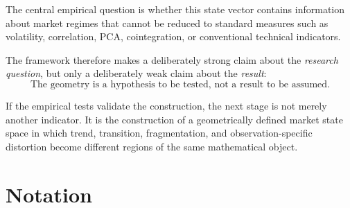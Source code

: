 \documentclass[11pt,a4paper]{article}
\numberwithin{equation}{section}
\begin{document}
The central empirical question is whether this state vector contains
information about market regimes that cannot be reduced to standard
measures such as volatility, correlation, PCA, cointegration, or
conventional technical indicators.

The framework therefore makes a deliberately strong claim about the
\emph{research question}, but only a deliberately weak claim about
the \emph{result}:
\[
\boxed{
\text{The geometry is a hypothesis to be tested, not a result to be
assumed.}
}
\]

If the empirical tests validate the construction, the next stage is
not merely another indicator. It is the construction of a
geometrically defined market state space in which trend, transition,
fragmentation, and observation-specific distortion become different
regions of the same mathematical object.

\appendix

\section{Notation}
\end{document}
